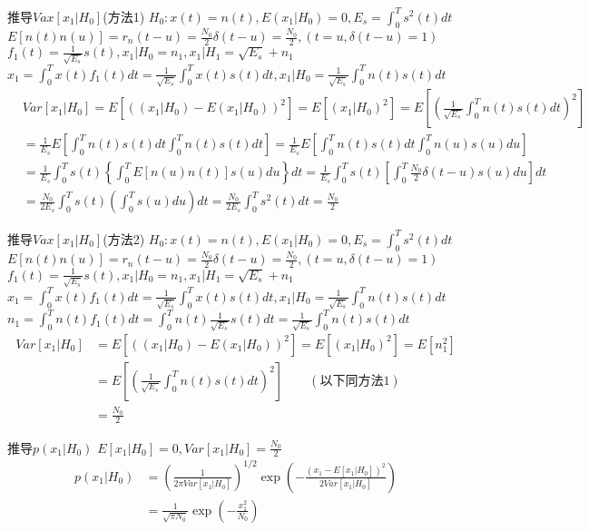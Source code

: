 \begin{frame}{推导$Vax[x_1|H_0]$(方法1)}
$H_0:x(t)=n(t), E(x_1|H_0)=0,E_s=\int_{0}^{T}s^2(t)dt$\\
$E[n(t)n(u)]=r_n(t-u)=\frac{N_0}{2}\delta(t-u)=\frac{N_0}{2},(t=u,\delta(t-u)=1)$\\
$f_1(t)=\frac{1}{\sqrt{E_s}}s(t),x_1|H_0=n_1,x_1|H_1=\sqrt{E_s}+n_1$\\ $x_1=\int_{0}^{T}x(t)f_1(t)dt=\frac{1}{\sqrt{E_s}}\int_{0}^{T}x(t)s(t)dt,x_1|H_0=\frac{1}{\sqrt{E_s}}\int_{0}^{T}n(t)s(t)dt$
\begin{align*}
&Var[x_1|H_0]=E[((x_1|H_0)-E(x_1|H_0))^2]=E[(x_1|H_0)^2]=E\left[\left(\frac{1}{\sqrt{E_s}}\int_{0}^{T}n(t)s(t)dt\right)^2\right]\\
&=\frac{1}{E_s}E\left[\int_{0}^{T}n(t)s(t)dt\int_{0}^{T}n(t)s(t)dt\right]=\frac{1}{E_s}E\left[\int_{0}^{T}n(t)s(t)dt\int_{0}^{T}n(u)s(u)du\right]\\
&=\frac{1}{E_s}\int_{0}^{T}s(t)\left\{\int_{0}^{T}E[n(u)n(t)]s(u)du\right\}dt=\frac{1}{E_s}\int_{0}^{T}s(t)\left[\int_{0}^{T}\frac{N_0}{2}\delta(t-u)s(u)du\right]dt\\
&=\frac{N_0}{2E_s}\int_{0}^{T}s(t)\left(\int_{0}^{T}s(u)du\right)dt=\frac{N_0}{2E_s}\int_{0}^{T}s^2(t)dt=\frac{N_0}{2}
\end{align*}
\end{frame}

\begin{frame}{推导$Vax[x_1|H_0]$(方法2)}
$H_0:x(t)=n(t), E(x_1|H_0)=0,E_s=\int_{0}^{T}s^2(t)dt$\\
$E[n(t)n(u)]=r_n(t-u)=\frac{N_0}{2}\delta(t-u)=\frac{N_0}{2},(t=u,\delta(t-u)=1)$\\
$f_1(t)=\frac{1}{\sqrt{E_s}}s(t),x_1|H_0=n_1,x_1|H_1=\sqrt{E_s}+n_1$\\ $x_1=\int_{0}^{T}x(t)f_1(t)dt=\frac{1}{\sqrt{E_s}}\int_{0}^{T}x(t)s(t)dt,x_1|H_0=\frac{1}{\sqrt{E_s}}\int_{0}^{T}n(t)s(t)dt$
$n_1=\int_{0}^{T}n(t)f_1(t)dt=\int_{0}^{T}n(t)\frac{1}{\sqrt{E_s}}s(t)dt=\frac{1}{\sqrt{E_s}}\int_{0}^{T}n(t)s(t)dt$
\begin{align*}
Var[x_1|H_0]&=E[((x_1|H_0)-E(x_1|H_0))^2]=E[(x_1|H_0)^2]=E[n_1^2]\\
&=E\left[\left(\frac{1}{\sqrt{E_s}}\int_{0}^{T}n(t)s(t)dt\right)^2\right]\qquad (\text{以下同方法1})\\
&=\frac{N_0}{2}
\end{align*}
\end{frame}

\begin{frame}{推导$p(x_1|H_0)$}
$E[x_1|H_0]=0,Var[x_1|H_0]=\frac{N_0}{2}$
\begin{align*}
p(x_1|H_0)&=\left(\frac{1}{2\pi Var[x_1|H_0]}\right)^{1/2}\exp\left(-\frac{(x_1-E[x_1|H_0])^2}{2Var[x_1|H_0]}\right)\\
&=\frac{1}{\sqrt{\pi N_0}}\exp\left(-\frac{x_1^2}{N_0}\right)
\end{align*}
\end{frame}

